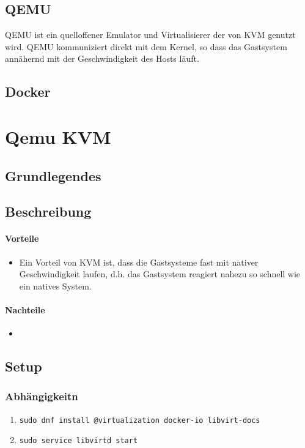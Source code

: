 \subsection{QEMU}
QEMU ist ein quelloffener Emulator und Virtualisierer der von KVM genutzt wird.  QEMU kommuniziert direkt mit dem Kernel, so dass das Gastsystem annähernd mit der Geschwindigkeit des Hosts läuft.

\subsection{Docker}


\section{Qemu KVM}
\subsection{Grundlegendes}

\subsection{Beschreibung}
\paragraph{Vorteile}
\begin{itemize}
	\item Ein Vorteil von KVM ist, dass die Gastsysteme fast mit nativer Geschwindigkeit laufen, d.h. das Gastsystem reagiert nahezu so schnell wie ein natives System. 
\end{itemize}
\paragraph{Nachteile}
\begin{itemize}
	\item 
\end{itemize}

\subsection{Setup}
\subsubsection{Abhängigkeitn}
\begin{enumerate}
	\item \lstinline|sudo dnf install @virtualization docker-io libvirt-docs|
	\item \lstinline|sudo service libvirtd start|
\end{enumerate}

